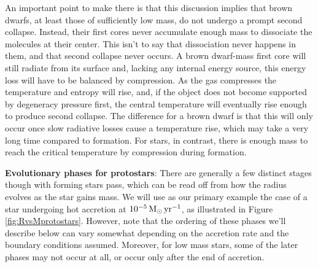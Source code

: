 \documentclass[a4paper,10pt]{article}
\begin{document}
{\noindent}An important point to make there is that this discussion implies that brown dwarfs, at least those of sufficiently low mass, do not undergo a prompt second collapse. Instead, their first cores never accumulate enough mass to dissociate the molecules at their center. This isn't to say that dissociation never happens in them, and that second collapse never occurs. A brown dwarf-mass first core will still radiate from its surface and, lacking any internal energy source, this energy loss will have to be balanced by compression. As the gas compresses the temperature and entropy will rise, and, if the object does not become supported by degeneracy pressure first, the central temperature will eventually rise enough to produce second collapse. The difference for a brown dwarf is that this will only occur once slow radiative losses cause a temperature rise, which may take a very long time compared to formation. For stars, in contrast, there is enough mass to reach the critical temperature by compression during formation.

{\noindent}\textbf{Evolutionary phases for protostars}: There are generally a few distinct stages though with forming stars pass, which can be read off from how the radius evolves as the star gains mass. We will use as our primary example the case of a star undergoing hot accretion at $10^{-5}\,{\rm M_\odot\,yr^{-1}}$, as illustrated in Figure \ref{fig:RvsMprotostars}. However, note that the ordering of these phases we'll describe below can vary somewhat depending on the accretion rate and the boundary conditions assumed. Moreover, for low mass stars, some of the later phases may not occur at all, or occur only after the end of accretion.
\end{document}
